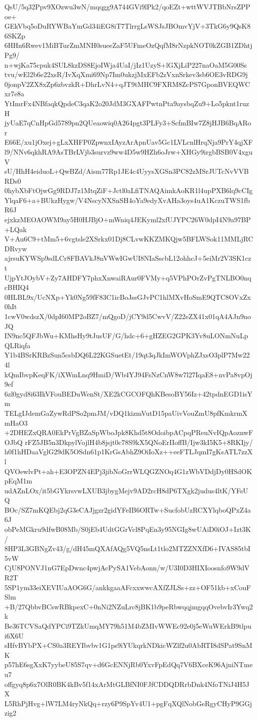 QsU/5q32Ppv9XOzwu3wN/mqqgg9A744GVi9lPk2/qoEZt+wttWVJTBbNrsZPPoe+
GEkVbq5oDuRYWBaYmGd34iEG8iT7TlrrgLsWSJsJBOmvYjV+3TkG6y9QsK86SKZp
6HHn6Rwev1MiBTurZmMNH0sueeZaF5UFmeOzQqfM8rNzpkNOT0kZGB1ZDhtjPg9/
n+wjKa75cpuk4SUL8kzDS8EjoIWja4UaI/jIz1UzyS+lGXjLiP227naOaM5G00Ss
tvu/wEl2b6e22xsR/IvXqXmi69Np7Im0ukzjMxEFb2zVxnSrkev3sb6OE3vRDG9j
0jonpV2ZX8xZp6zbvzkR+DhrLvN4+qJT9tMHC9FXRM8ZcPS7GponBVEQWCxr7e8a
YtImrFx4NBfaqkQpdeC3qaK2o20JdM3GXAFPwtnPta9aysbqZu9+Lo5pknt1ruzH
jyUaE7qCnHpGd5789pn2QUeaowiq0A264pgt3PLFy3+ScfmBIw7Z8jHJB6BqARor
E66E/xu1jOxej+gLxXHFP0ZpwnxIAyzArApnUav5Gc1LVLcnlHrqNja9PrY4qjXF
l9/NNv6qkhRA9AsTBrLVjb3survz9ww4D5w9HZh6oJrw+XHGy9irgbBSB0V4xguV
sU/HhH4eiduoL+QwBZd/Aism77Rp1JE4c4UyysXGSn3PC82zMSrJUTcNvVVBRDs0
0hybXbFtOjwGg9RDJ7z1MtqZiF+Jctl0aLfiTNAQAimkAoKR1l4upPXB6lq9cCIg
YlqaF6+a+BUkzHygw/V4NscyNXSnSH4oYa9edyXvAHa3oys4uA1KczuTWS1fbR6J
ejxkzMEOAOWM9ay5H0HJBjO+mWniq4JEKyml2xfUJYPC26W0dpI4N9a97BP+LQak
V+Au6C9+tMm5+6vgtsle2XSrkx01Dj8CLvwKKZMKQjw5BFLWSok11MMLjRCDRvyw
ajrsuKYWSp9sdLCr8FBAVkJ8nVWwIGwUI8NIaSscbL12ohhcJ+5eiMr2V3SK1czt
UjpYtJOybV+Zy7AHDFY7phxXnwaiRAur0FVMy+q5VPhPOrZvPgTNLBO0nqcBHIQ4
0HLBL9x/UcNXp+Yk0Ng59fF83C1icBoJssGJvPC1hlMXvHoSmE9QTC8OVxZx0hIt
1cwV0wdszX/0dpI60MP2oBZ7/mQgoD/jCY9d5CwvV/Z22eZX41x01qA4AJn9noJQ
IN9nc5QFJbWu+KMhsHy9tJusUF/G/hdc+6+gHZEG2GPK3Yv8uLONmNuLpQLRiqfa
Y1b4BSrKRBzSun5csbDQ6L22KGSuetEt/19qt3qJkImWOVphZJxsO3plP7Mw224l
kQmIbvpKeqFK/iXWmLnq9HmiD/Wb4YJ94FsNzCnW8w7l27IqaE8+nvPa8vpOj9ef
6zl0gyd8i63IkVFouBEDuWenSt/XE2kCGCOFQhKBesoBY56Iz+42tpdnEGD1isYm
TELgIJdemGaZywRdPSo2pmJM/vDQ1kizmVutD15paUivVouZmU8pfKmkrmXmHaO3
+2DHEZxQRA0EkPrVgBZaSpWboJpk8Khd5t8OdoibpACpqPReuNvIQpAoznwFOJbQ
rFZ5JB5n3DkpylVojlH4b8jsjt0c78S9kX5QNoErIIoffB/Ijw3kI5K5+8RKIjy/
h0f1hHDaaVglG29dK5OSdn61p1KrGsAbhZ9OiIoXz++eeFTLJqmI7gKsATL7zzXl
QVOewlvPt+ah+E3OPZN4EPj3jibNoGrrWLQGZNOq4G1zWbVDdjDy0HSdOKpEqM1m
udAZnLOx/it5bGYkrsvwLXUB3jbygMejv9AD2rcH8dP6TXgk2judus4ltK/YFsUQ
BOc/SZ7mKQEbj2qG3eCAJjgzr2gidYFeIB6ORTw+SucfobUzRCXYlqboQPxZ4a6J
obPeMGkru9dfwB08Mb/S0jEb4UdtGGrVcl8PqEn3y95NGIg8wUAiD0iOJ+Izt3K/
8HP3L3GBNgZv43/g/dH45mQXAfAQg5VQ5nsLt1tlo2MTZZNXfD6+IVAS85tbI5vW
CjU8PONVJ1nG7EpDwnc4pwjAcPySA1VebAonn/w/U3I0D3HIXIoosnfo9W9dVR2T
5SP1ym33eiXEVIUaAOG6G/ankkgaaAFcxxwwcAXfZJLSs+zz+OF51kb+xCouFSlm
+B/27QbbvBCswRBkpexC+0nNi2NZuLrc8jBK1b9peRbwqqjmgqqOvebvIr3Ywq2k
Be36TCVSaQdYPCi9TZkUmqMY79h51M4bZMIvWWEc92e0j5eWuWErkB9tlpui6X6U
sHfvBYbPX+CS0a3REYIbvbv1G1ps9iYUkqrkNDkicWZlf2u0AbRTI8dSPat9SnMK
p57hE6sgXxK7yybeU85S7qv+d6GcENNjRb0YxvFpEdQq7V6BXceK96AjniNTmeu7
offgyq8p6x7OlR0BK4kBv5f14xArMtGLBfNI0FJfCDDQDRrbDnk4NfoTNiJ4H5JX
L5RhPjHvg+lW7LM4ryNkQq+rzy6P9SpYv4U1+pgFqXQlNobGeRgyCHyP9GGjzig2
